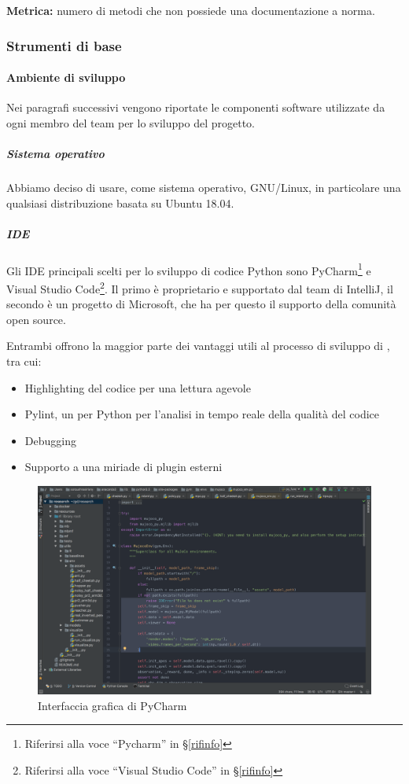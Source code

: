        \textbf{Metrica:} numero di metodi che non possiede una documentazione a norma.
        
        \subsubsection{Strumenti di base}\label{PP:Sviluppo:Strumenti}

	    \paragraph{Ambiente di sviluppo}\label{PP:Sviluppo:Strumenti:AmbienteSviluppo}
	    Nei paragrafi successivi vengono riportate le componenti software utilizzate da ogni membro del team per lo sviluppo del progetto.


	    \subparagraph{Sistema operativo}\label{PP:Sviluppo:Strumenti:AmbienteSviluppo:SistemaOperativo}
	    Abbiamo deciso di usare, come sistema operativo, GNU/Linux, in particolare una qualsiasi distribuzione basata su Ubuntu 18.04.

	    \subparagraph{IDE}\label{PP:Sviluppo:Strumenti:AmbienteSviluppo:IDE} %
		Gli IDE principali scelti per lo sviluppo di codice Python sono
		{PyCharm}\footnote{Riferirsi alla voce ``Pycharm'' in \S\ref{rifinfo}} e
		{Visual Studio Code}\footnote{Riferirsi alla voce ``Visual Studio Code'' in \S\ref{rifinfo}}.
		Il primo è proprietario e supportato dal team di IntelliJ, il secondo è un progetto  di Microsoft, che ha
		per questo il supporto della comunità open source.\par
		Entrambi offrono la maggior parte dei vantaggi utili al processo di sviluppo di \progetto, tra cui:
		\begin{itemize}
			\item Highlighting del codice per una lettura agevole
			\item Pylint, un  per Python per l'analisi in tempo reale della qualità del codice
			\item Debugging
			\item Supporto a una miriade di plugin esterni
		\end{itemize}

		\begin{figure}[H]
			\includegraphics[width=\textwidth]{img/pycharm.png}
			\caption{Interfaccia grafica di PyCharm}
		\end{figure}
